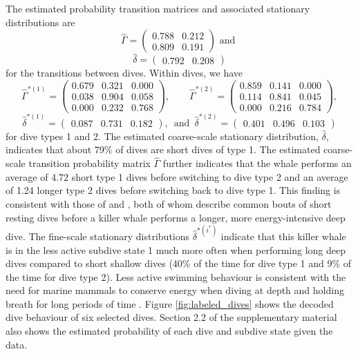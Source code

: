 The estimated probability transition matrices and associated stationary distributions are
%
$$\hat \Gamma = \begin{pmatrix} 
0.788 & 0.212 \\
0.809 & 0.191
\end{pmatrix} \text{ and }$$
$$\hat \delta = \begin{pmatrix} 0.792 & 0.208 \end{pmatrix}$$
%
for the transitions between dives. Within dives, we have
$$\hat \Gamma^{*(1)} = \begin{pmatrix} 
0.679 & 0.321 & 0.000 \\
0.038 & 0.904 & 0.058 \\
0.000 & 0.232 & 0.768
\end{pmatrix}, \qquad 
\hat \Gamma^{*(2)} = \begin{pmatrix} 
0.859 & 0.141 & 0.000 \\
0.114 & 0.841 & 0.045 \\
0.000 & 0.216 & 0.784
\end{pmatrix},$$
$$\hat \delta^{*(1)} = \begin{pmatrix} 0.087 & 0.731 & 0.182 \end{pmatrix}, \enspace \text{and} \enspace \hat \delta^{*(2)} = \begin{pmatrix} 0.401 & 0.496 & 0.103 \end{pmatrix}$$
%
for dive types 1 and 2.
The estimated coarse-scale stationary distribution, $\hat{\delta}$, indicates that about 79\% of dives are short dives of type 1. The estimated coarse-scale transition probability matrix $\hat \Gamma$ further indicates that the whale performs an average of 4.72 short type 1 dives before switching to dive type 2 and an average of 1.24 longer type 2 dives before switching back to dive type 1. This finding is consistent with those of \citet{Tennessen:2019b} and \citet{Williams:2009}, both of whom describe common bouts of short resting dives before a killer whale performs a longer, more energy-intensive deep dive. The fine-scale stationary distributions $\hat{\delta}^{*(i^*)}$ indicate that this killer whale is in the less active subdive state 1 much more often when performing long deep dives compared to short shallow dives (40\% of the time for dive type 1 and 9\% of the time for dive type 2). Less active swimming behaviour is consistent with the need for marine mammals to conserve energy when diving at depth and holding breath for long periods of time \citep{Williams:1999,Hastie:2006}. Figure \ref{fig:labeled_dives} shows the decoded dive behaviour of six selected dives. Section 2.2 of the supplementary material also shows the estimated probability of each dive and subdive state given the data.

